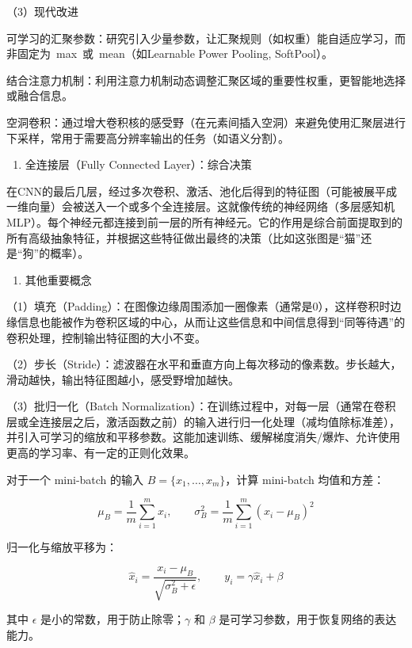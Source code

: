 （3）现代改进

可学习的汇聚参数：研究引入少量参数，让汇聚规则（如权重）能自适应学习，而非固定为~max~或~mean（如Learnable Power Pooling, SoftPool）。

结合注意力机制：利用注意力机制动态调整汇聚区域的重要性权重，更智能地选择或融合信息。

空洞卷积：通过增大卷积核的感受野（在元素间插入空洞）来避免使用汇聚层进行下采样，常用于需要高分辨率输出的任务（如语义分割）。

\begin{enumerate}
\def\labelenumi{\arabic{enumi}.}
\setcounter{enumi}{3}
\tightlist
\item
  全连接层（Fully Connected Layer）：综合决策
\end{enumerate}

在CNN的最后几层，经过多次卷积、激活、池化后得到的特征图（可能被展平成一维向量）会被送入一个或多个全连接层。这就像传统的神经网络（多层感知机MLP）。每个神经元都连接到前一层的所有神经元。它的作用是综合前面提取到的所有高级抽象特征，并根据这些特征做出最终的决策（比如这张图是``猫''还是``狗''的概率）。

\begin{enumerate}
\def\labelenumi{\arabic{enumi}.}
\setcounter{enumi}{4}
\tightlist
\item
  其他重要概念
\end{enumerate}

（1）填充（Padding）：在图像边缘周围添加一圈像素（通常是0），这样卷积时边缘信息也能被作为卷积区域的中心，从而让这些信息和中间信息得到``同等待遇''的卷积处理，控制输出特征图的大小不变。

（2）步长（Stride）：滤波器在水平和垂直方向上每次移动的像素数。步长越大，滑动越快，输出特征图越小，感受野增加越快。

（3）批归一化（Batch Normalization）：在训练过程中，对每一层（通常在卷积层或全连接层之后，激活函数之前）的输入进行归一化处理（减均值除标准差），并引入可学习的缩放和平移参数。这能加速训练、缓解梯度消失/爆炸、允许使用更高的学习率、有一定的正则化效果。

对于一个 mini-batch 的输入 \(B=\{x_1,\ldots,x_m\}\)，计算 mini-batch 均值和方差：

\[
\mu_B=\frac{1}{m}\sum_{i=1}^{m}x_i,\qquad
\sigma_B^2=\frac{1}{m}\sum_{i=1}^{m}(x_i-\mu_B)^2
\]

归一化与缩放平移为：

\[
\hat{x}_i=\frac{x_i-\mu_B}{\sqrt{\sigma_B^2+\epsilon}},\qquad
y_i=\gamma\hat{x}_i+\beta
\]

其中 \(\epsilon\) 是小的常数，用于防止除零；\(\gamma\) 和 \(\beta\) 是可学习参数，用于恢复网络的表达能力。


